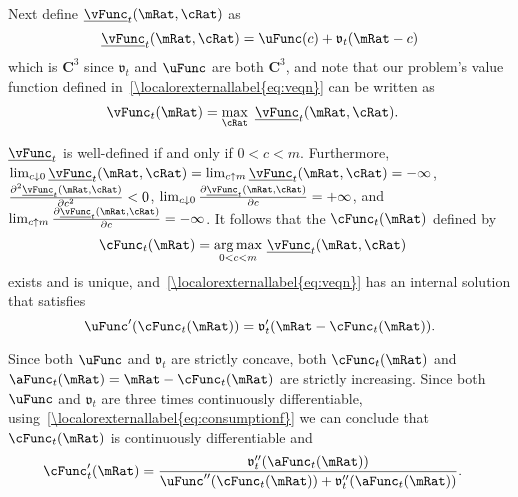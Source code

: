 \documentclass[\econtexRoot/BufferStockTheory]{subfiles}
\begin{document}
Next define $\underline{\vFunc}_{t}(\mRat,\cRat)$ as
\begin{equation}
\underline{\vFunc}_{t}(\mRat,\cRat)=\uFunc(c)+\mathfrak{v}_{t}(\mRat-c)
\end{equation}
which is $\mathbf{C}^{3}$ since $\mathfrak{v}_{t}$ and $\uFunc$ are both
$\mathbf{C}^{3}$, and note that our problem's value function defined
in~\eqref{\localorexternallabel{eq:veqn}} can be written as
\begin{equation}\begin{gathered}\begin{aligned}
\vFunc_{t}(\mRat)  & =  \max_{\cRat}~\underline{\vFunc}_{t}(\mRat,\cRat).
\end{aligned}\end{gathered}\end{equation}

$\underline{\vFunc}_{t}$ is well-defined if and only if $0<c<m$.  Furthermore,
$\lim_{c \downarrow
  0}\underline{\vFunc}_{t}(\mRat,\cRat)=\lim_{c\uparrow m} \underline{\vFunc}_{t}(\mRat,\cRat)=-\infty $, $\frac{\partial ^{2}\underline{\vFunc}_{t}(\mRat,\cRat)}{\partial c^{2}}%
<0$, $\lim_{c \downarrow 0}\frac{\partial \underline{\vFunc}_{t}(\mRat,\cRat)}{\partial c}%
=+\infty $, and $\lim_{c\uparrow m} \frac{\partial \underline{\vFunc}_{t}(\mRat,\cRat)}{%
\partial c}=-\infty $. It follows that the $\cFunc_{t}(\mRat)$ defined by
\begin{equation}\begin{gathered}\begin{aligned}
\cFunc_{t}(\mRat)  & = \underset{0<c<m}{\arg \max }~\underline{\vFunc}_{t}(\mRat,\cRat)
\end{aligned}\end{gathered}\end{equation}
exists and is unique, and~\eqref{\localorexternallabel{eq:veqn}} has an internal
solution that satisfies
\begin{equation}
\uFunc^{\prime }(\cFunc_{t}(\mRat))=\mathfrak{v}_{t}^{\prime }(\mRat-\cFunc_{t}(\mRat))  \label{eq:consumptionf}.
\end{equation}


Since both $\uFunc$ and $\mathfrak{v}_{t}$ are strictly concave, both
$\cFunc_{t}(\mRat)$ and $\aFunc_{t}(\mRat)=\mRat-\cFunc_{t}(\mRat)$
are strictly increasing. Since both $\uFunc$ and $\mathfrak{v}_{t}$ are
three times continuously differentiable, using~\eqref{\localorexternallabel{eq:consumptionf}} we can conclude that
$\cFunc_{t}(\mRat)$ is continuously differentiable and
\begin{equation}\begin{gathered}\begin{aligned}
\cFunc_{t}^{\prime }(\mRat)  & = \frac{\mathfrak{v}_{t}^{\prime \prime }({\aFunc}_{t}(\mRat))  }{\uFunc^{\prime \prime }(\cFunc_{t}(\mRat))+\mathfrak{v}_{t}^{\prime \prime }({\aFunc}_{t}(\mRat))}.
\end{aligned}\end{gathered}\end{equation}
\end{document}
